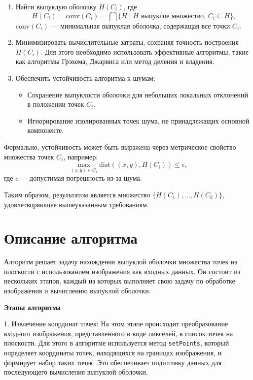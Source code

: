 \documentclass{report}
\begin{document}
\begin{enumerate}
    \item Найти выпуклую оболочку \( H(C_i) \), где  
    \[
    H(C_i) = \text{conv}(C_i) = \bigcap \{H \mid H \text{ выпуклое множество, } C_i \subseteq H \},
    \]
    \( \text{conv}(C_i) \) — минимальная выпуклая оболочка, содержащая все точки \( C_i \).  

    \item Минимизировать вычислительные затраты, сохраняя точность построения \( H(C_i) \). Для этого необходимо использовать эффективные алгоритмы, такие как алгоритмы Грэхема, Джарвиса или метод деления и владения.  

    \item Обеспечить устойчивость алгоритма к шумам:  
    \begin{itemize}
        \item Сохранение выпуклости оболочки для небольших локальных отклонений в положении точек \( C_i \).  
        \item Игнорирование изолированных точек шума, не принадлежащих основной компоненте.  
    \end{itemize}
\end{enumerate}

Формально, устойчивость может быть выражена через метрическое свойство множества точек \( C_i \), например:  
\[
\max_{(x, y) \in C_i} \text{dist}((x, y), H(C_i)) \leq \epsilon,
\]
где \( \epsilon \) — допустимая погрешность из-за шума.  

Таким образом, результатом является множество \( \{H(C_1), \dots, H(C_k)\} \), удовлетворяющее вышеуказанным требованиям.

\newpage
\section*{Описание алгоритма}

Алгоритм решает задачу нахождения выпуклой оболочки множества точек на плоскости с использованием изображения как входных данных. Он состоит из нескольких этапов, каждый из которых выполняет свою задачу по обработке изображения и вычислению выпуклой оболочки.

\textbf{Этапы алгоритма}  

1. Извлечение координат точек:
    На этом этапе происходит преобразование входного изображения, представленного в виде пикселей, в список точек на плоскости. Для этого в алгоритме используется метод \texttt{setPoints}, который определяет координаты точек, находящихся на границах изображения, и формирует набор таких точек. Это обеспечивает подготовку данных для последующего вычисления выпуклой оболочки.
\end{document}
